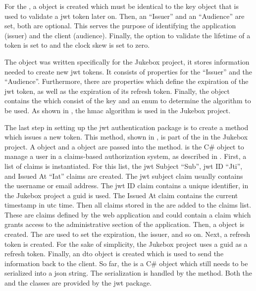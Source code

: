 For the , a  object is created which must be identical to the key object that is used to validate a \gls{jwt} token later on. Then, an \enquote{Issuer} and an \enquote{Audience} are set, both are optional. This serves the purpose of identifying the application (issuer) and the client (audience). Finally, the option to validate the lifetime of a token is set to  and the clock skew is set to zero. \cite{jwtTokenAuth}


The  object was written specifically for the Jukebox project, it stores information needed to create new \gls{jwt} tokens. It consists of properties for the \enquote{Issuer} and the \enquote{Audience}. Furthermore, there are properties which define the expiration of the \gls{jwt} token, as well as the expiration of its refresh token. Finally, the  object contains the  which consist of the key and an enum to determine the algorithm to be used. As shown in , the \gls{hmac} algorithm is used in the Jukebox project.


The last step in setting up the \gls{jwt} authentication package is to create a method which issues a new token. This method, shown in , is part of the  in the Jukebox project. A  object and a  object are passed into the method.  is the C\# object to manage a user in a claims-based authorization system, as described in . First, a list of claims is instantiated. For this list, the \gls{jwt} Subject \enquote{Sub}, \gls{jwt} ID \enquote{Jti}, and Issued At \enquote{Iat} claims are created. The \gls{jwt} subject claim usually contains the username or email address. The \gls{jwt} ID claim contains a unique identifier, in the Jukebox project a \gls{guid} is used. The Issued At claim contains the current timestamp in \gls{utc} time. Then all claims stored in the  are added to the claims list. These are claims defined by the web application and could contain a claim which grants access to the administrative section of the application. Then, a  object is created. The  are used to set the expiration, the issuer, and so on. Next, a refresh token is created. For the sake of simplicity, the Jukebox project uses a \gls{guid} as a refresh token. Finally, an  \gls{dto} object is created which is used to send the information back to the client. So far, the  is a C\# object which still needs to be serialized into a \gls{json} string. The serialization is handled by the  method. Both the  and the  classes are provided by the \gls{jwt} package.

